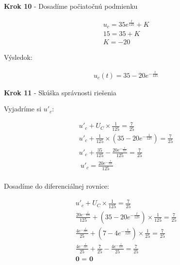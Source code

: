 \begin{center}
    \textbf{Krok 10} - Dosadíme počiatočnú podmienku
\end{center}

\begin{gather*}
   u_{c} = 35e^{\frac{t}{125}} + K \\
   15 = 35 + K \\
    K = - 20
\end{gather*}


Výsledok:

\begin{gather*}
	u_{c}(t) = 35-20e^{-\frac{t}{125}}
\end{gather*}

\begin{center}
    \textbf{Krok 11} - Skúška správnosti riešenia 
\end{center}

Vyjadríme si $u'_c$:

\begin{gather*}
    u'_{c} + U_{C} \times \frac {1} {125} = \frac {7} {25} \\
    u'_{c} + \frac{1}{125} \times (35-20e^{-\frac{1}{125}}) = \frac {7} {25}\\
    u'_{c} + \frac {35}{125} - \frac {20e^{- \frac {t}{125}}} {125} = \frac {7} {25} \\\
    u'_{c} = \frac {20e^{- \frac {t}{125}}} {125} \\
\end{gather*}

Dosadíme do diferenciálnej rovnice:
 
\begin{gather*}
    u'_{c} + U_{C} \times \frac {1} {125} = \frac {7} {25} \\
    \frac {20e^{- \frac {t}{125}}} {125} + (35-20e^{-\frac{t}{125}}) \times \frac {1}{125} = \frac {7}{25} \\
    \frac {4e^{- \frac {t}{125}}} {25} + (7-4e^{-\frac{t}{125}}) \times \frac {1}{25} = \frac {7}{25} \\
    \frac {4e^{- \frac {t}{125}}} {25} + \frac {7}{25} - \frac {4e^{-\frac{t}{125}}} {25} = \frac {7}{25} \\
    \textbf{0 = 0} \\
\end{gather*}


